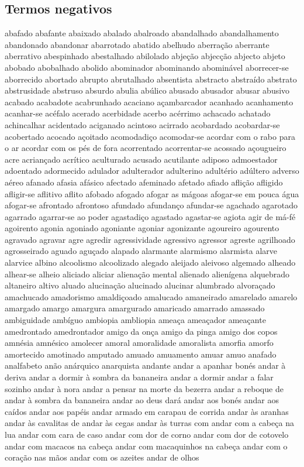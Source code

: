 \begin{appendices}
\subsection{Termos negativos}
abafado abafante abaixado abalado abalroado abandalhado abandalhamento abandonado abandonar abarrotado abatido abelhudo aberra\c{c}\~ao aberrante aberrativo abespinhado abestalhado abilolado abje\c{c}\~ao abjec\c{c}\~ao abjecto abjeto abobado abobalhado abolido abominador abominando abomin\'{a}vel aborrecer-se aborrecido abortado abrupto abrutalhado absentista abstracto abstra\'{i}do abstrato abstrusidade abstruso absurdo abulia ab\'{u}lico abusado abusador abusar abusivo acabado acabadote acabrunhado acaciano a\c{c}ambarcador acanhado acanhamento acanhar-se ac\'{e}falo acerado acerbidade acerbo ac\'{e}rrimo achacado achatado achincalhar acidentado aciganado acintoso acirrado acobardado acobardar-se acobertado acocado a\c{c}oitado acomodadi\c{c}o acomodar-se acordar com o rabo para o ar acordar com os p\'{e}s de fora acorrentado acorrentar-se acossado a\c{c}ougueiro acre acrian\c{c}ado acr\'{i}tico aculturado acusado acutilante adiposo admoestador adoentado adormecido adulador adulterador adulterino adult\'{e}rio ad\'{u}ltero adverso a\'{e}reo afanado afasia af\'{a}sico afectado afeminado afetado afiado afli\c{c}\~ao afligido afligir-se aflitivo aflito afobado afogado afogar as m\'{a}goas afogar-se em pouca \'{a}gua afogar-se afrontado afrontoso afundado afundan\c{c}o afundar-se agachado agarotado agarrado agarrar-se ao poder agastadi\c{c}o agastado agastar-se agiota agir de m\'{a}-f\'{e} agoirento agonia agoniado agoniante agoniar agonizante agoureiro agourento agravado agravar agre agredir agressividade agressivo agressor agreste agrilhoado agrosseirado aguado agu\c{c}ado alapado alarmante alarmismo alarmista alarve alarvice albino alcoolismo alcoolizado alegado aleijado aleivoso algemado alheado alhear-se alheio aliciado aliciar aliena\c{c}\~ao mental alienado alien\'{i}gena alquebrado altaneiro altivo aluado alucina\c{c}\~ao alucinado alucinar alumbrado alvora\c{c}ado amachucado amadorismo amaldi\c{c}oado amalucado amaneirado amarelado amarelo amargado amargo amargura amargurado amaricado amarrado amassado ambiguidade amb\'{i}guo ambiopia ambliopia amea\c{c}a amea\c{c}ador amea\c{c}ante amedrontado amedrontador amigo da on\c{c}a amigo da pinga amigo dos copos amn\'{e}sia amn\'{e}sico amolecer amoral amoralidade amoralista amorfia amorfo amortecido amotinado amputado amuado amuamento amuar amuo anafado analfabeto an\~ao an\'{a}rquico anarquista andante andar a apanhar bon\'{e}s andar \`{a} deriva andar a dormir \`{a} sombra da bananeira andar a dormir andar a falar sozinho andar \`{a} nora andar a pensar na morte da bezerra andar a reboque de andar \`{a} sombra da bananeira andar ao deus dar\'{a} andar aos bon\'{e}s andar aos ca\'{i}dos andar aos pap\'{e}is andar armado em carapau de corrida andar \`{a}s aranhas andar \`{a}s cavalitas de andar \`{a}s cegas andar \`{a}s turras com andar com a cabe\c{c}a na lua andar com cara de caso andar com dor de corno andar com dor de cotovelo andar com macacos na cabe\c{c}a andar com macaquinhos na cabe\c{c}a andar com o cora\c{c}\~ao nas m\~aos andar com os azeites andar de olhos 
\end{appendices}

